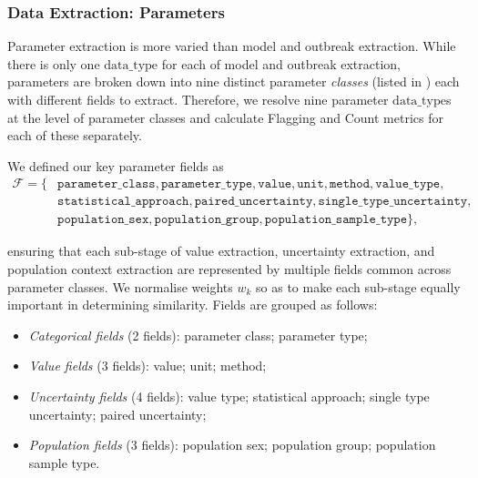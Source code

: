 \subsubsection*{Data Extraction: Parameters}

Parameter extraction is more varied than model and outbreak extraction. While there is only one $\mathrm{data\_type}$ for each of model and outbreak extraction, parameters are broken down into nine distinct parameter \textit{classes} (listed in ) each with different fields to extract. Therefore, we resolve nine parameter $\mathrm{data\_type}$s at the level of parameter classes and calculate Flagging and Count metrics for each of these separately.

We defined our key parameter fields as
\begin{align*}
    \mathcal{F} = \{&\texttt{parameter\_class}, \texttt{parameter\_type}, \texttt{value}, \texttt{unit}, \texttt{method}, \texttt{value\_type}, \\& \texttt{statistical\_approach}, \texttt{paired\_uncertainty}, \texttt{single\_type\_uncertainty}, \\
    &\texttt{population\_sex}, \texttt{population\_group}, \texttt{population\_sample\_type}\},
\end{align*}

ensuring that each sub-stage of value extraction, uncertainty extraction, and population context extraction are represented by multiple fields common across parameter classes. We normalise weights $w_k$ so as to make each sub-stage equally important in determining similarity. Fields are grouped as follows:
\vspace{-8pt}
\begin{itemize}[leftmargin=*, itemsep=-3pt]
\item \textit{Categorical fields} (2 fields): parameter class; parameter type;
\item \textit{Value fields} (3 fields): value; unit; method;
\item \textit{Uncertainty fields} (4 fields): value type; statistical approach; single type uncertainty; paired uncertainty;
\item \textit{Population fields} (3 fields): population sex; population group; population sample type.
\end{itemize}


